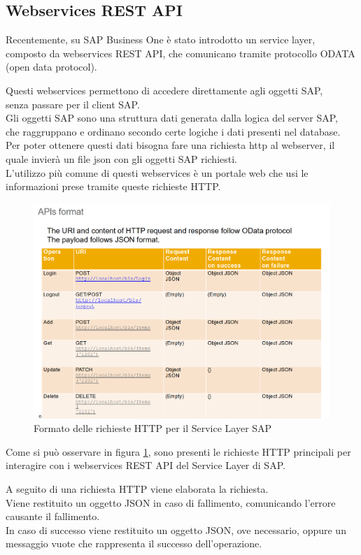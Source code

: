 \subsection{Webservices REST API}
\begin{flushleft}
	\item Recentemente, su SAP Business One è stato introdotto un service layer, composto da webservices REST API, che comunicano tramite protocollo ODATA (open data protocol).
	\item Questi webservices permettono di accedere direttamente agli oggetti SAP,\\senza passare per il client SAP.\\Gli oggetti SAP sono una struttura dati generata dalla logica del server SAP, \\che raggruppano e ordinano secondo certe logiche i dati presenti nel database.
	\\ Per poter ottenere questi dati bisogna fare una richiesta http al webserver, il quale invierà un file json con gli oggetti SAP richiesti.
	\\L'utilizzo più comune di questi webservices è un portale web che usi le informazioni prese tramite queste richieste HTTP. 
\end{flushleft}
\begin{figure}[!h] 
	\centering 
	\includegraphics[scale = 0.37]{immagini/api_Format.png} 
	\caption {Formato delle richieste HTTP per il Service Layer SAP}
	\label{fig:2-11}
\end{figure}
\begin{flushleft}
	\item Come si può osservare in figura \ref{fig:2-11}, sono presenti le richieste HTTP principali per interagire con i webservices REST API del Service Layer di SAP.
	\item A seguito di una richiesta HTTP viene elaborata la richiesta.\\Viene restituito un oggetto JSON in caso di fallimento, comunicando l'errore causante il fallimento.\\In caso di successo viene restituito un oggetto JSON, ove necessario, oppure un messaggio vuote che rappresenta il successo dell'operazione.
\end{flushleft}
